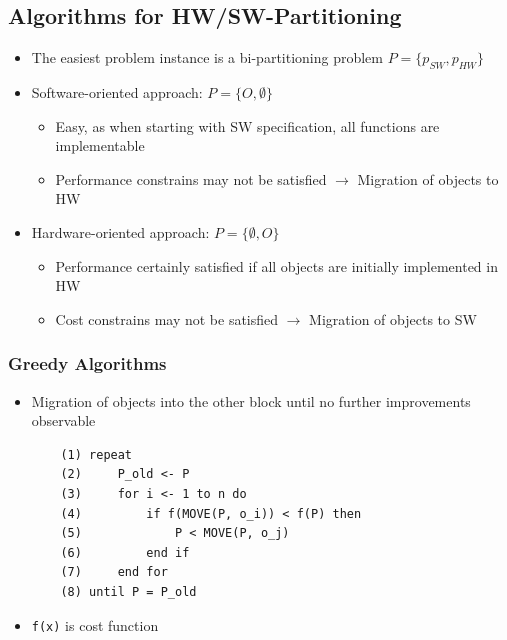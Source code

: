 \subsection{Algorithms for HW/SW-Partitioning}
\begin{itemize}
	\item The easiest problem instance is a bi-partitioning problem $P=\{p_{SW}, p_{HW}\}$
	\item Software-oriented approach: $P=\{O, \emptyset\}$
\begin{itemize}
	\item Easy, as when starting with SW specification, all functions are implementable
	\item Performance constrains may not be satisfied $\rightarrow$ Migration of objects to HW 
\end{itemize}
	\item Hardware-oriented approach: $P=\{\emptyset, O\}$
\begin{itemize}
	\item Performance certainly satisfied if all objects are initially implemented in HW
	\item Cost constrains may not be satisfied $\rightarrow$ Migration of objects to SW
\end{itemize}
\end{itemize}

\subsubsection{Greedy Algorithms}
\begin{itemize}
	\item Migration of objects into the other block until no further improvements observable
\begin{verbatim}
	(1) repeat
	(2)     P_old <- P
	(3)     for i <- 1 to n do
	(4)         if f(MOVE(P, o_i)) < f(P) then
	(5)             P < MOVE(P, o_j)
	(6)         end if
	(7)     end for
	(8) until P = P_old
\end{verbatim}
	\item \verb|f(x)| is cost function
\end{itemize}

